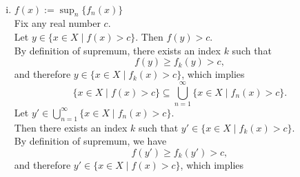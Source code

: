 \begin{enumerate}
    \\\begin{enumerate}[(i)]
        \item $f(x):=\sup_n\{f_n(x)\}$
        \\Fix any real number $c$.
        \\Let $y\in\{x\in X\mid f(x)>c\}$.
        Then $f(y)>c$.
        \\By definition of supremum, there exists an index $k$ such that 
        \[
            f(y)\ge f_k(y)>c,
        \]
        and therefore $y\in\{x\in X\mid f_k(x)>c\}$, which implies
        \[
            \{x\in X\mid f(x)>c\}\subseteq\bigcup_{n=1}^\infty\{x\in X\mid f_n(x)>c\}.\tag{1}
        \]
        Let $y'\in\bigcup_{n=1}^\infty\{x\in X\mid f_n(x)>c\}$.
        \\Then there exists an index $k$ such that $y'\in\{x\in X\mid f_k(x)>c\}$.
        \\By definition of supremum, we have 
        \[
            f(y')\ge f_k(y')>c,
        \]
        and therefore $y'\in\{x\in X\mid f(x)>c\}$, which implies
        

\end{enumerate}
\end{enumerate}
